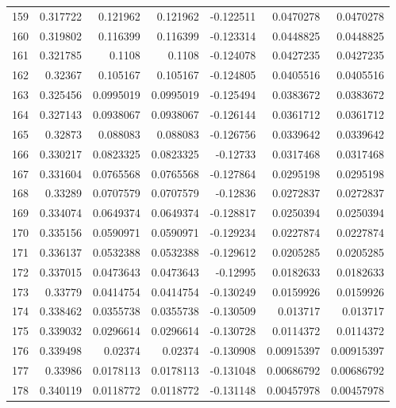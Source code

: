 \begin{tabular}{rrrrrrr}
 159 &  0.317722    & 0.121962    & 0.121962    & -0.122511    & 0.0470278   & 0.0470278   \\
 160 &  0.319802    & 0.116399    & 0.116399    & -0.123314    & 0.0448825   & 0.0448825   \\
 161 &  0.321785    & 0.1108      & 0.1108      & -0.124078    & 0.0427235   & 0.0427235   \\
 162 &  0.32367     & 0.105167    & 0.105167    & -0.124805    & 0.0405516   & 0.0405516   \\
 163 &  0.325456    & 0.0995019   & 0.0995019   & -0.125494    & 0.0383672   & 0.0383672   \\
 164 &  0.327143    & 0.0938067   & 0.0938067   & -0.126144    & 0.0361712   & 0.0361712   \\
 165 &  0.32873     & 0.088083    & 0.088083    & -0.126756    & 0.0339642   & 0.0339642   \\
 166 &  0.330217    & 0.0823325   & 0.0823325   & -0.12733     & 0.0317468   & 0.0317468   \\
 167 &  0.331604    & 0.0765568   & 0.0765568   & -0.127864    & 0.0295198   & 0.0295198   \\
 168 &  0.33289     & 0.0707579   & 0.0707579   & -0.12836     & 0.0272837   & 0.0272837   \\
 169 &  0.334074    & 0.0649374   & 0.0649374   & -0.128817    & 0.0250394   & 0.0250394   \\
 170 &  0.335156    & 0.0590971   & 0.0590971   & -0.129234    & 0.0227874   & 0.0227874   \\
 171 &  0.336137    & 0.0532388   & 0.0532388   & -0.129612    & 0.0205285   & 0.0205285   \\
 172 &  0.337015    & 0.0473643   & 0.0473643   & -0.12995     & 0.0182633   & 0.0182633   \\
 173 &  0.33779     & 0.0414754   & 0.0414754   & -0.130249    & 0.0159926   & 0.0159926   \\
 174 &  0.338462    & 0.0355738   & 0.0355738   & -0.130509    & 0.013717    & 0.013717    \\
 175 &  0.339032    & 0.0296614   & 0.0296614   & -0.130728    & 0.0114372   & 0.0114372   \\
 176 &  0.339498    & 0.02374     & 0.02374     & -0.130908    & 0.00915397  & 0.00915397  \\
 177 &  0.33986     & 0.0178113   & 0.0178113   & -0.131048    & 0.00686792  & 0.00686792  \\
 178 &  0.340119    & 0.0118772   & 0.0118772   & -0.131148    & 0.00457978  & 0.00457978  \\

\end{tabular}
